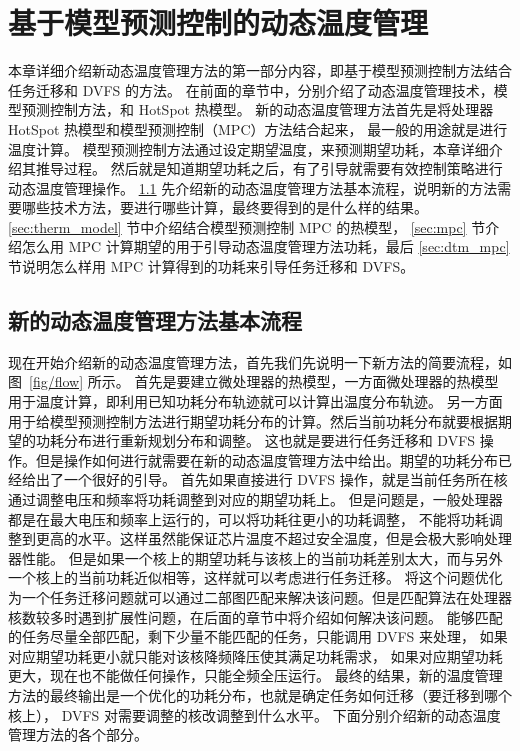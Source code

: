 
\chapter{基于模型预测控制的动态温度管理}\label{chapter:mpc}

本章详细介绍新动态温度管理方法的第一部分内容，即基于模型预测控制方法结合任务迁移和 DVFS 的方法。
在前面的章节中，分别介绍了动态温度管理技术，模型预测控制方法，和 HotSpot 热模型。
新的动态温度管理方法首先是将处理器 HotSpot 热模型和模型预测控制（MPC）方法结合起来，
最一般的用途就是进行温度计算。
模型预测控制方法通过设定期望温度，来预测期望功耗，本章详细介绍其推导过程。
然后就是知道期望功耗之后，有了引导就需要有效控制策略进行动态温度管理操作。
 \ref{sec:new_overview} 先介绍新的动态温度管理方法基本流程，说明新的方法需要哪些技术方法，要进行哪些计算，最终要得到的是什么样的结果。
 \ref{sec:therm_model} 节中介绍结合模型预测控制 MPC 的热模型， \ref{sec:mpc} 节介绍怎么用 MPC 计算期望的用于引导动态温度管理方法功耗，最后 \ref{sec:dtm_mpc} 节说明怎么样用 MPC 计算得到的功耗来引导任务迁移和 DVFS。

 \section{新的动态温度管理方法基本流程}\label{sec:new_overview}
 
 现在开始介绍新的动态温度管理方法，首先我们先说明一下新方法的简要流程，如图~\ref{fig/flow} 所示。
 首先是要建立微处理器的热模型，一方面微处理器的热模型用于温度计算，即利用已知功耗分布轨迹就可以计算出温度分布轨迹。
 另一方面用于给模型预测控制方法进行期望功耗分布的计算。然后当前功耗分布就要根据期望的功耗分布进行重新规划分布和调整。
 这也就是要进行任务迁移和 DVFS 操作。但是操作如何进行就需要在新的动态温度管理方法中给出。期望的功耗分布已经给出了一个很好的引导。
 首先如果直接进行 DVFS 操作，就是当前任务所在核通过调整电压和频率将功耗调整到对应的期望功耗上。
 但是问题是，一般处理器都是在最大电压和频率上运行的，可以将功耗往更小的功耗调整，
 不能将功耗调整到更高的水平。这样虽然能保证芯片温度不超过安全温度，但是会极大影响处理器性能。
 但是如果一个核上的期望功耗与该核上的当前功耗差别太大，而与另外一个核上的当前功耗近似相等，这样就可以考虑进行任务迁移。
 将这个问题优化为一个任务迁移问题就可以通过二部图匹配来解决该问题。但是匹配算法在处理器核数较多时遇到扩展性问题，在后面的章节中将介绍如何解决该问题。
 能够匹配的任务尽量全部匹配，剩下少量不能匹配的任务，只能调用 DVFS 来处理， 如果对应期望功耗更小就只能对该核降频降压使其满足功耗需求，
 如果对应期望功耗更大，现在也不能做任何操作，只能全频全压运行。
 最终的结果，新的温度管理方法的最终输出是一个优化的功耗分布，也就是确定任务如何迁移（要迁移到哪个核上）， DVFS 对需要调整的核改调整到什么水平。
 下面分别介绍新的动态温度管理方法的各个部分。
 
